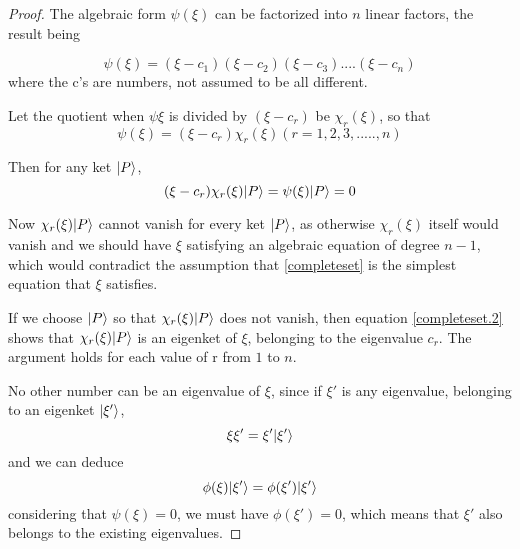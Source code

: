 \begin{proof}
The algebraic form $\psi(\xi)$ can be factorized into $n$ linear factors, the result being 

\begin{equation}
\psi (\xi) = (\xi - c_1) (\xi - c_2)(\xi - c_3)....(\xi - c_n)
\end{equation}
where the c's are numbers, not assumed to be all different.

Let the quotient when $\psi{\xi}$ is divided by $(\xi - c_r)$ be $\chi_r (\xi)$, so that 
\begin{equation*}
\psi(\xi) = (\xi - c_r) \chi_r (\xi) (r = 1, 2, 3,....., n)
\end{equation*}

Then for any ket $| P \rangle$,
\begin{equation}
(\xi - c_r) \chi_r(\xi) | P \rangle = \psi (\xi) | P \rangle = 0
\label{completeset.2}
\end{equation}

Now $\chi_r (\xi) | P \rangle$ cannot vanish for every ket $| P \rangle$, as otherwise $\chi_r(\xi)$ itself would vanish and we should have $\xi$ satisfying an algebraic equation of degree $n-1$, which would contradict the assumption that \ref{completeset} is the simplest equation that $\xi$ satisfies.

If we choose $| P \rangle$ so that $\chi_r(\xi) | P \rangle$ does not vanish, then equation \ref{completeset.2} shows that $\chi_r(\xi) | P \rangle$ is an eigenket of $\xi$, belonging to the eigenvalue $c_r$. The argument holds for each value of r from $1$ to $n$.

No other number can be an eigenvalue of $\xi$, since if $\xi'$ is any eigenvalue, belonging to an eigenket $| \xi' \rangle$,
\begin{equation*}
\xi{\xi'}=\xi'| \xi' \rangle
\end{equation*}
and we can deduce
\begin{equation*}
\phi (\xi) | \xi' \rangle=\phi(\xi') | \xi' \rangle
\end{equation*}
considering that $\psi(\xi)=0$, we must have $\phi(\xi')=0$, which means that $\xi'$ also belongs to the existing eigenvalues.


\end{proof}
